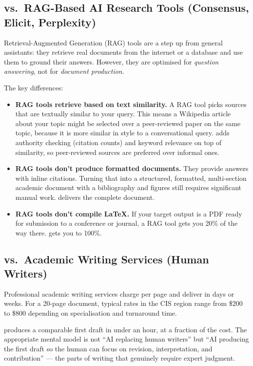 \subsection{vs.\ RAG-Based AI Research Tools (Consensus, Elicit, Perplexity)}

Retrieval-Augmented Generation (RAG) tools are a step up from general assistants:
they retrieve real documents from the internet or a database and use them to ground
their answers.
However, they are optimised for \emph{question answering}, not for
\emph{document production}.

The key differences:

\begin{itemize}
  \item \textbf{RAG tools retrieve based on text similarity.}
        A RAG tool picks sources that are textually similar to your query.
        This means a Wikipedia article about your topic might be selected over a
        peer-reviewed paper on the same topic, because it is more similar in style
        to a conversational query.
        \sys{} adds authority checking (citation counts) and keyword relevance
        on top of similarity, so peer-reviewed sources are preferred over informal ones.

  \item \textbf{RAG tools don't produce formatted documents.}
        They provide answers with inline citations.
        Turning that into a structured, formatted, multi-section academic document
        with a bibliography and figures still requires significant manual work.
        \sys{} delivers the complete document.

  \item \textbf{RAG tools don't compile \LaTeX{}.}
        If your target output is a PDF ready for submission to a conference or journal,
        a RAG tool gets you 20\% of the way there.
        \sys{} gets you to 100\%.
\end{itemize}

\subsection{vs.\ Academic Writing Services (Human Writers)}

Professional academic writing services charge per page and deliver in days or weeks.
For a 20-page document, typical rates in the CIS region range from
\$200 to \$800 depending on specialisation and turnaround time.

\sys{} produces a comparable first draft in under an hour, at a fraction of the cost.
The appropriate mental model is not ``AI replacing human writers'' but
``AI producing the first draft so the human can focus on revision, interpretation,
and contribution'' — the parts of writing that genuinely require expert judgment.

